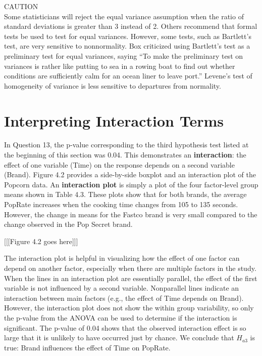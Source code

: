 \documentclass[
]{report}
\begin{document}
CAUTION\\
Some statisticians will reject the equal variance assumption when the ratio of standard deviations is
greater than 3 instead of 2. Others recommend that formal tests be used to test for equal variances.
However, some tests, such as Bartlett's test, are very sensitive to nonnormality. Box criticized using
Bartlett's test as a preliminary test for equal variances, saying ``To make the preliminary test on variances
is rather like putting to sea in a rowing boat to find out whether conditions are sufficiently calm
for an ocean liner to leave port.'' Levene's test of homogeneity of variance is less sensitive to departures
from normality.

\section{Interpreting Interaction Terms}\label{interpreting-interaction-terms}

In Question 13, the p-value corresponding to the third hypothesis test listed at the beginning of this section
was 0.04. This demonstrates an \textbf{interaction}: the effect of one variable (Time) on the response depends on a
second variable (Brand). Figure 4.2 provides a side-by-side boxplot and an interaction plot of the Popcorn
data. An \textbf{interaction plot} is simply a plot of the four factor-level group means shown in Table 4.3. These plots
show that for both brands, the average PopRate increases when the cooking time changes from 105 to 135
seconds. However, the change in means for the Fastco brand is very small compared to the change observed
in the Pop Secret brand.

{[}{[}{[}Figure 4.2 goes here{]}{]}{]}

The interaction plot is helpful in visualizing how the effect of one factor can depend on another factor,
especially when there are multiple factors in the study. When the lines in an interaction plot are essentially
parallel, the effect of the first variable is not influenced by a second variable. Nonparallel lines indicate an
interaction between main factors (e.g., the effect of Time depends on Brand). However, the interaction plot
does not show the within group variability, so only the p-value from the ANOVA can be used to determine
if the interaction is significant. The p-value of 0.04 shows that the observed interaction effect is so large that
it is unlikely to have occurred just by chance. We conclude that \(H_{a3}\) is true: Brand influences the effect of
Time on PopRate.
\end{document}
